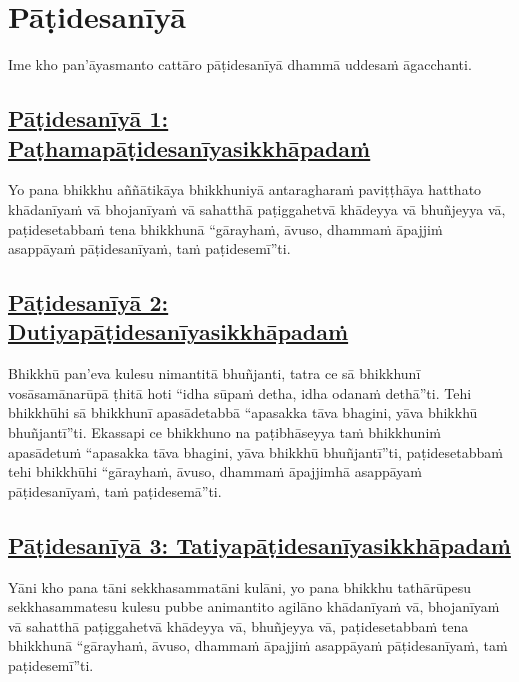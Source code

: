 \section{Pāṭidesanīyā}
\label{pd}

\begin{intro}
  Ime kho pan'āyasmanto cattāro pāṭidesanīyā dhammā uddesaṁ āgacchanti.
\end{intro}

\setsubsecheadstyle{\subsubsectionFmt}
\subsection*{\hyperref[ack1]{Pāṭidesanīyā 1: Paṭhamapāṭidesanīyasikkhāpadaṁ}}
\label{pd1}

Yo pana bhikkhu aññātikāya bhikkhuniyā antaragharaṁ paviṭṭhāya hatthato khādanīyaṁ vā bhojanīyaṁ vā sahatthā paṭiggahetvā khādeyya vā bhuñjeyya vā, paṭidesetabbaṁ tena bhikkhunā “gārayhaṁ, āvuso, dhammaṁ āpajjiṁ asappāyaṁ pāṭidesanīyaṁ, taṁ paṭidesemī”ti.

\subsection*{\hyperref[ack2]{Pāṭidesanīyā 2: Dutiyapāṭidesanīyasikkhāpadaṁ}}
\label{pd2}

Bhikkhū pan'eva kulesu nimantitā bhuñjanti, tatra ce sā bhikkhunī vosāsamānarūpā ṭhitā hoti “idha sūpaṁ detha, idha odanaṁ dethā”ti. Tehi bhikkhūhi sā bhikkhunī apasādetabbā “apasakka tāva bhagini, yāva bhikkhū bhuñjantī”ti. Ekassapi ce bhikkhuno na paṭibhāseyya taṁ bhikkhuniṁ apasādetuṁ “apasakka tāva bhagini, yāva bhikkhū bhuñjantī”ti, paṭidesetabbaṁ tehi bhikkhūhi “gārayhaṁ, āvuso, dhammaṁ āpajjimhā asappāyaṁ pāṭidesanīyaṁ, taṁ paṭidesemā”ti.

\subsection*{\hyperref[ack3]{Pāṭidesanīyā 3: Tatiyapāṭidesanīyasikkhāpadaṁ}}
\label{pd3}

Yāni kho pana tāni sekkhasammatāni kulāni, yo pana bhikkhu tathārūpesu sekkhasammatesu kulesu pubbe animantito agilāno khādanīyaṁ vā, bhojanīyaṁ vā sahatthā paṭiggahetvā khādeyya vā, bhuñjeyya vā, paṭidesetabbaṁ tena bhikkhunā “gārayhaṁ, āvuso, dhammaṁ āpajjiṁ asappāyaṁ pāṭidesanīyaṁ, taṁ paṭidesemī”ti.


